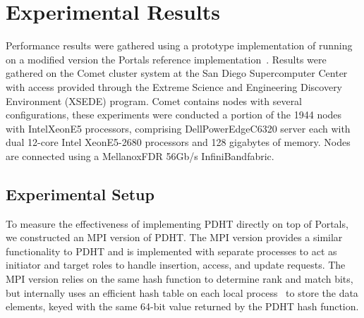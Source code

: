 \section{Experimental Results}




Performance results were gathered using a prototype implementation of \pdht
running on a modified version the Portals reference
implementation~\cite{portals-code}. Results were gathered on the Comet cluster
system at the San Diego Supercomputer Center with access provided through the
Extreme Science and Engineering Discovery Environment (XSEDE) program. Comet
contains nodes with several configurations, these experiments were conducted a
portion of the 1944 nodes with Intel\regtm Xeon\regtm E5 processors, comprising
Dell\othertm PowerEdge\othertm C6320 server each with dual 12-core Intel\regtm
Xeon\regtm E5-2680 processors and 128 gigabytes of memory. Nodes are connected
using a Mellanox\othertm FDR 56Gb/s InfiniBand\othertm fabric.

\subsection{Experimental Setup}

To measure the effectiveness of implementing PDHT directly on top of Portals,
we constructed an MPI version of PDHT. The MPI version provides a similar
functionality to PDHT and is implemented with separate processes to act as
initiator and target roles to handle insertion, access, and update requests.
The MPI version relies on the same hash function to determine rank and match
bits, but internally uses an efficient hash table on each local
process~\cite{uthash} to store the data elements, keyed with the same 64-bit
value returned by the PDHT hash function. 


